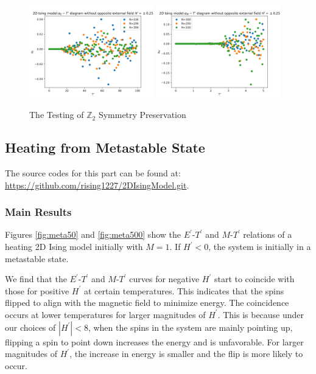 \documentclass[11pt]{article}
\begin{document}
\begin{figure}\label{ETM}
    \centering
    \includegraphics[width=0.48\textwidth]{plots/alphaE-T.png}\hfill
    \includegraphics[width=0.48\textwidth]{plots/alphaM-T.png}
    \caption{The Testing of $\mathbb{Z}_2$ Symmetry Preservation}
    \label{E-T/N}
\end{figure}

\subsection{Heating from Metastable State}\label{heating1}
The source codes for this part can be found at: \url{https://github.com/rising1227/2DIsingModel.git}.

\subsubsection{Main Results}
Figures \ref{fig:meta50} and \ref{fig:meta500} show the $E^\prime$-$T^\prime$ and $M$-$T^\prime$ relations of a heating 2D Ising model initially with $M = 1$. If $H^\prime < 0$, the system is initially in a metastable state.

We find that the $E^\prime$-$T^\prime$ and $M$-$T^\prime$ curves for negative $H^\prime$ start to coincide with those for positive $H^\prime$ at certain temperatures. This indicates that the spins flipped to align with the magnetic field to minimize energy. The coincidence occurs at lower temperatures for larger magnitudes of $H^\prime$. This is because under our choices of $|H^\prime| < 8$, when the spins in the system are mainly pointing up, flipping a spin to point down increases the energy and is unfavorable. For larger magnitudes of $H^\prime$, the increase in energy is smaller and the flip is more likely to occur.
\end{document}
